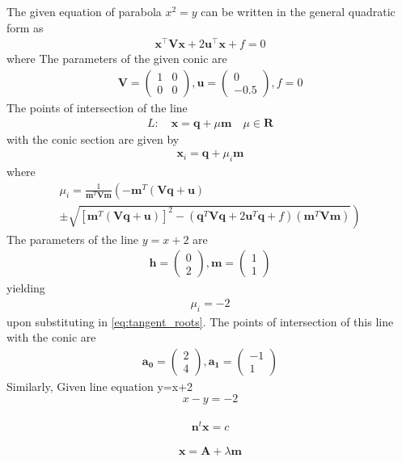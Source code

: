 \documentclass[journal,10pt,twocolumn]{article}
\let\vec\mathbf
\newcommand{\myvec}[1]{\ensuremath{\begin{pmatrix}#1\end{pmatrix}}}
\providecommand{\brak}[1]{\ensuremath{\left(#1\right)}}
\providecommand{\lbrak}[1]{\ensuremath{\left(#1\right.}}
\providecommand{\rbrak}[1]{\ensuremath{\left.#1\right)}}
\providecommand{\sbrak}[1]{\ensuremath{{}\left[#1\right]}}
\begin{document}
{The given equation of parabola $x^2 = y$ can be written in the general quadratic form as
\begin{align}
    \label{eq:conic_quad_form}
    \vec{x}^{\top}\vec{V}\vec{x}+2\vec{u}^{\top}\vec{x}+f=0
    \end{align}
where
The parameters of the given conic are
\begin{align}
 \vec{V} = \myvec{1 & 0\\0 & 0},
 \vec{u} = \myvec{0\\-0.5},
 f = 0
\end{align}
The points of intersection of the line 
\begin{align}
 L: \quad \vec{x} = \vec{q} + \mu \vec{m} \quad \mu \in \mathbf{R}
\label{eq:conic_tangent}
\end{align}
with the conic section are given by
\begin{align}
\vec{x}_i = \vec{q} + \mu_i \vec{m}
\label{eq:conic_tangent_pts}
\end{align}
%
where
{\tiny
\begin{multline}
\mu_i = \frac{1}
{
\vec{m}^T\vec{V}\vec{m}
}
\lbrak{-\vec{m}^T\brak{\vec{V}\vec{q}+\vec{u}}}
\\
\pm
\rbrak{\sqrt{
\sbrak{
\vec{m}^T\brak{\vec{V}\vec{q}+\vec{u}}
}^2
-
\brak
{
\vec{q}^T\vec{V}\vec{q} + 2\vec{u}^T\vec{q} +f
}
\brak{\vec{m}^T\vec{V}\vec{m}}
}
}
\label{eq:tangent_roots}
\end{multline}
}
The parameters of the line $y=x+2$ are
\begin{align}
\vec{h}=\myvec{0\\2},
\vec{m}=\myvec{1\\1}
\end{align}
yielding
\begin{align}
\mu_i=-2
\end{align}
upon substituting in \eqref{eq:tangent_roots}.     The points of intersection of this line with the conic are
\begin{align}
\vec{a_0}=\myvec{2\\4},
\vec{a_1}=\myvec{-1\\1}
\end{align}
Similarly, 
Given line equation y=x+2\\

$$x-y=-2$$\\
$$\vec{n}^{t}\vec{x}=c$$\\
$$\vec{x}=\vec{A}+\lambda \vec{m}$$\\


}
\end{document}
